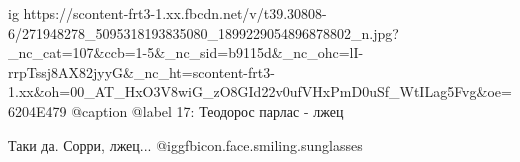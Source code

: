  
 
 
 
 

\ifcmt
  ig https://scontent-frt3-1.xx.fbcdn.net/v/t39.30808-6/271948278_5095318193835080_1899229054896878802_n.jpg?_nc_cat=107&ccb=1-5&_nc_sid=b9115d&_nc_ohc=lI-rrpTssj8AX82jyyG&_nc_ht=scontent-frt3-1.xx&oh=00_AT_HxO3V8wiG_zO8GId22v0ufVHxPmD0uSf_WtILag5Fvg&oe=6204E479
  @caption @label 17: Теодорос парлас - лжец
\fi


Таки да. Сорри, лжец... @igg{fbicon.face.smiling.sunglasses} 
